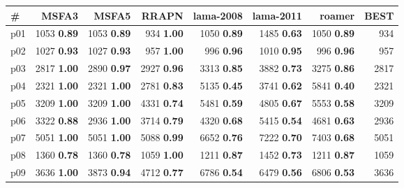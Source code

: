 \begin{tabular}{|l|rrrrrr|r|}
\hline
\textbf{\#} & \textbf{MSFA3} & \textbf{MSFA5} & \textbf{RRAPN} & \textbf{lama-2008} & \textbf{lama-2011} & \textbf{roamer} & \textbf{BEST}\\
\hline
p01 & {\footnotesize 1053} \textbf{0.89} & {\footnotesize 1053} \textbf{0.89} & {\footnotesize 934} \textbf{1.00} & {\footnotesize 1050} \textbf{0.89} & {\footnotesize 1485} \textbf{0.63} & {\footnotesize 1050} \textbf{0.89} & 934\\
p02 & {\footnotesize 1027} \textbf{0.93} & {\footnotesize 1027} \textbf{0.93} & {\footnotesize 957} \textbf{1.00} & {\footnotesize 996} \textbf{0.96} & {\footnotesize 1010} \textbf{0.95} & {\footnotesize 996} \textbf{0.96} & 957\\
p03 & {\footnotesize 2817} \textbf{1.00} & {\footnotesize 2890} \textbf{0.97} & {\footnotesize 2927} \textbf{0.96} & {\footnotesize 3313} \textbf{0.85} & {\footnotesize 3882} \textbf{0.73} & {\footnotesize 3275} \textbf{0.86} & 2817\\
p04 & {\footnotesize 2321} \textbf{1.00} & {\footnotesize 2321} \textbf{1.00} & {\footnotesize 2781} \textbf{0.83} & {\footnotesize 5135} \textbf{0.45} & {\footnotesize 3741} \textbf{0.62} & {\footnotesize 5841} \textbf{0.40} & 2321\\
p05 & {\footnotesize 3209} \textbf{1.00} & {\footnotesize 3209} \textbf{1.00} & {\footnotesize 4331} \textbf{0.74} & {\footnotesize 5481} \textbf{0.59} & {\footnotesize 4805} \textbf{0.67} & {\footnotesize 5553} \textbf{0.58} & 3209\\
p06 & {\footnotesize 3322} \textbf{0.88} & {\footnotesize 2936} \textbf{1.00} & {\footnotesize 3714} \textbf{0.79} & {\footnotesize 4320} \textbf{0.68} & {\footnotesize 5415} \textbf{0.54} & {\footnotesize 4681} \textbf{0.63} & 2936\\
p07 & {\footnotesize 5051} \textbf{1.00} & {\footnotesize 5051} \textbf{1.00} & {\footnotesize 5088} \textbf{0.99} & {\footnotesize 6652} \textbf{0.76} & {\footnotesize 7222} \textbf{0.70} & {\footnotesize 7403} \textbf{0.68} & 5051\\
p08 & {\footnotesize 1360} \textbf{0.78} & {\footnotesize 1360} \textbf{0.78} & {\footnotesize 1059} \textbf{1.00} & {\footnotesize 1211} \textbf{0.87} & {\footnotesize 1452} \textbf{0.73} & {\footnotesize 1211} \textbf{0.87} & 1059\\
p09 & {\footnotesize 3636} \textbf{1.00} & {\footnotesize 3873} \textbf{0.94} & {\footnotesize 4712} \textbf{0.77} & {\footnotesize 6786} \textbf{0.54} & {\footnotesize 6479} \textbf{0.56} & {\footnotesize 6806} \textbf{0.53} & 3636\\

\end{tabular}
